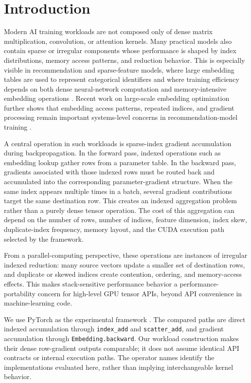 \section{Introduction}

Modern AI training workloads are not composed only of dense matrix multiplication, convolution, or attention kernels. Many practical models also contain sparse or irregular components whose performance is shaped by index distributions, memory access patterns, and reduction behavior. This is especially visible in recommendation and sparse-feature models, where large embedding tables are used to represent categorical identifiers and where training efficiency depends on both dense neural-network computation and memory-intensive embedding operations \citep{gupta2020architectural}. Recent work on large-scale embedding optimization further shows that embedding access patterns, repeated indices, and gradient processing remain important systems-level concerns in recommendation-model training \citep{liu2024embark}.

A central operation in such workloads is sparse-index gradient accumulation during backpropagation. In the forward pass, indexed operations such as embedding lookup gather rows from a parameter table. In the backward pass, gradients associated with those indexed rows must be routed back and accumulated into the corresponding parameter-gradient structure. When the same index appears multiple times in a batch, several gradient contributions target the same destination row. This creates an indexed aggregation problem rather than a purely dense tensor operation. The cost of this aggregation can depend on the number of rows, number of indices, feature dimension, index skew, duplicate-index frequency, memory layout, and the CUDA execution path selected by the framework.

From a parallel-computing perspective, these operations are instances of irregular indexed reduction: many source vectors update a smaller set of destination rows, and duplicate or skewed indices create contention, ordering, and memory-access effects. This makes stack-sensitive performance behavior a performance-portability concern for high-level GPU tensor APIs, beyond API convenience in machine-learning code.

We use PyTorch as the experimental framework \citep{paszke2019pytorch}. The compared paths are direct indexed accumulation through \texttt{index\_\allowbreak add} and \texttt{scatter\_\allowbreak add}, and gradient accumulation through \texttt{Embedding.\allowbreak backward}. Our workload construction makes their dense row-gradient outputs comparable; it does not assume identical API contracts or internal execution paths. The operator names identify the implementations evaluated here, rather than implying interchangeable kernel behavior.

